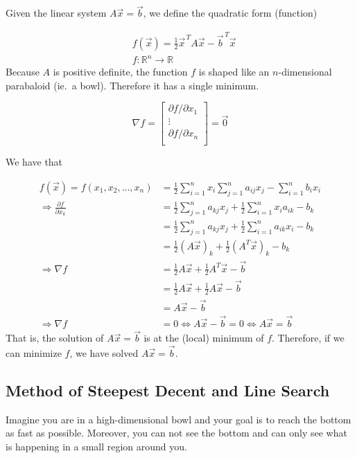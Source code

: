 Given the linear system $A\vec{x} = \vec{b}$, we define the quadratic form (function)

\begin{align*}
    &f(\vec{x}) = \frac{1}{2}\vec{x}^{\,T}A\vec{x} - \vec{b}^{\,T}\vec{x} \\
    &f: \mathbb{R}^n \rightarrow \mathbb{R}
\end{align*}
Because $A$ is positive definite, the function $f$ is shaped like an $n$-dimensional parabaloid (ie.\ a bowl). Therefore it has a single minimum.

\begin{equation*}
    \nabla f =
    \begin{bmatrix}
        \partial f / \partial x_1\\
        \vdots \\
        \partial f / \partial x_n\\
    \end{bmatrix}
    =\vec{0}
\end{equation*}

We have that

\begin{align*}
    f(\vec{x}) = f(x_1, x_2, \ldots, x_n) &= \frac{1}{2} \sum_{i=1}^{n} x_i \sum_{j=1}^{n} a_{ij} x_j - \sum_{i=1}^{n} b_i x_i \\
    \Rightarrow \frac{\partial f}{\partial x_k} &=\frac{1}{2} \sum_{j=1}^{n} a_{kj} x_j + \frac{1}{2} \sum_{i=1}^{n} x_i a_{ik} - b_k \\
    &=\frac{1}{2} \sum_{j=1}^{n} a_{kj} x_j + \frac{1}{2} \sum_{i=1}^{n} a_{ik} x_i - b_k \\
    &= \frac{1}{2} (A\vec{x})_k + \frac{1}{2} (A^T\vec{x})_k - b_k \\
    \Rightarrow \nabla f &= \frac{1}{2} A\vec{x} + \frac{1}{2} A^T\vec{x} - \vec{b} \\
    &= \frac{1}{2} A\vec{x} + \frac{1}{2} A\vec{x} - \vec{b} \\
    &= A\vec{x} - \vec{b} \\
    \Rightarrow \nabla f &= 0 \Leftrightarrow A\vec{x} - \vec{b} = 0
    \Leftrightarrow A \vec{x} = \vec{b}
\end{align*}
That is, the solution of $A \vec{x} = \vec{b}$ is at the (local) minimum of $f$. Therefore, if we can minimize $f$, we have solved $A \vec{x} = \vec{b}$.


\subsection*{Method of Steepest Decent and Line Search}
Imagine you are in a high-dimensional bowl and your goal is to reach the bottom as fast as possible. Moreover, you can not see the bottom and can only see what is happening in a small region around you.

